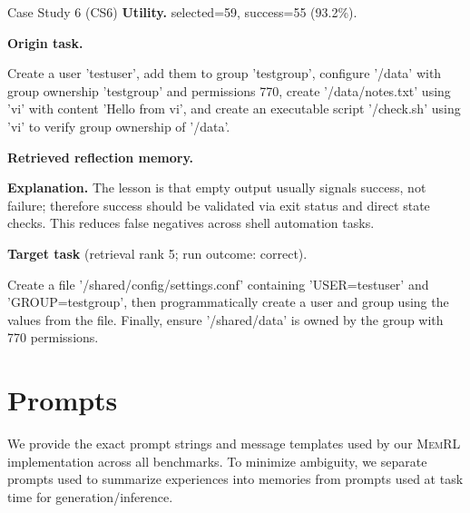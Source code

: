 \documentclass{article}
\theoremstyle{plain}
\theoremstyle{definition}
\theoremstyle{remark}
\begin{document}
\begin{CaseBox}{Case Study 6 (CS6)}
\textbf{Utility.} selected=59, success=55 (93.2\%).
\par\medskip
\textbf{Origin task.}
\begin{CodeBox}
Create a user 'testuser', add them to group 'testgroup', configure '/data' with group ownership 'testgroup' and permissions 770, create '/data/notes.txt' using 'vi' with content 'Hello from vi', and create an executable script '/check.sh' using 'vi' to verify group ownership of '/data'.
\end{CodeBox}
\medskip
\textbf{Retrieved reflection memory.}
\par\medskip
\textbf{Explanation.} The lesson is that empty output usually signals success, not failure; therefore success should be validated via exit status and direct state checks. This reduces false negatives across shell automation tasks.
\par\medskip
\textbf{Target task} (retrieval rank 5; run outcome: correct).
\begin{CodeBox}
Create a file '/shared/config/settings.conf' containing 'USER=testuser' and 'GROUP=testgroup', then programmatically create a user and group using the values from the file. Finally, ensure '/shared/data' is owned by the group with 770 permissions.
\end{CodeBox}
\end{CaseBox}
\medskip

\section{Prompts}
\label{app:prompts}
We provide the exact prompt strings and message templates used by our \textsc{MemRL} implementation 
across all benchmarks. To minimize ambiguity, we separate prompts used to summarize experiences into memories from
prompts used at task time for generation/inference.
\end{document}
